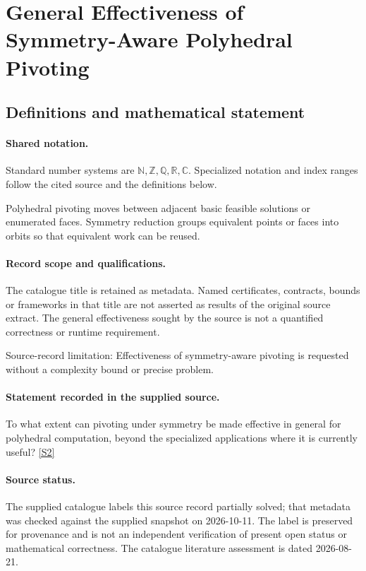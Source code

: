 \documentclass[11pt]{article}
\newcommand{\sref}[2]{\hyperlink{source:#1:#2}{[S#2]}}
\begin{document}
\section{General Effectiveness of Symmetry-Aware Polyhedral Pivoting}\label{statement}

\subsection{Definitions and mathematical statement}

\paragraph{Shared notation.}Standard number systems are $\mathbb N,\mathbb Z,\mathbb Q,\mathbb R,\mathbb C$. Specialized notation and index ranges follow the cited source and the definitions below.


Polyhedral pivoting moves between adjacent basic feasible solutions or enumerated faces. Symmetry reduction groups equivalent points or faces into orbits so that equivalent work can be reused.
\paragraph{Record scope and qualifications.}
The catalogue title is retained as metadata. Named certificates, contracts, bounds or frameworks in that title are not asserted as results of the original source extract.
The general effectiveness sought by the source is not a quantified correctness or runtime requirement.

Source-record limitation: Effectiveness of symmetry-aware pivoting is requested without a complexity bound or precise problem.
\paragraph{Statement recorded in the supplied source.}
To what extent can pivoting under symmetry be made effective in general for polyhedral computation, beyond the specialized applications where it is currently useful? \sref{statement}{2}
\paragraph{Source status.}
The supplied catalogue labels this source record partially solved; that metadata was checked against the supplied snapshot on 2026-10-11. The label is preserved for provenance and is not an independent verification of present open status or mathematical correctness. The catalogue literature assessment is dated 2026-08-21.
\end{document}
